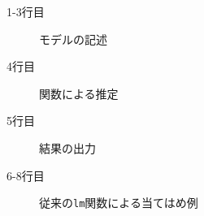 \begin{description}
	\item[1-3行目] モデルの記述
	\item[4行目] 関数による推定
	\item[5行目] 結果の出力
	\item[6-8行目] 従来の\texttt{lm}関数による当てはめ例
\end{description}
